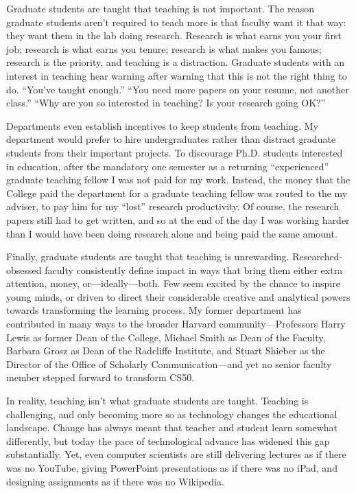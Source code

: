 Graduate students are taught that teaching is not important. The reason
graduate students aren't required to teach more is that faculty want it that
way: they want them in the lab doing research. Research is what earns you
your first job; research is what earns you tenure; research is what makes you
famous; research is the priority, and teaching is a distraction. Graduate
students with an interest in teaching hear warning after warning that this is
not the right thing to do. ``You've taught enough.'' ``You need more papers
on your resume, not another class.'' ``Why are you so interested in teaching?
Is your research going OK?''

Departments even establish incentives to keep students from teaching. My
department would prefer to hire undergraduates rather than distract graduate
students from their important projects. To discourage Ph.D. students
interested in education, after the mandatory one semester as a returning
``experienced'' graduate teaching fellow I was not paid for my work. Instead,
the money that the College paid the department for a graduate teaching fellow
was routed to the my adviser, to pay him for my ``lost'' research
productivity. Of course, the research papers still had to get written, and so
at the end of the day I was working harder than I would have been doing
research alone and being paid the same amount.

Finally, graduate students are taught that teaching is unrewarding.
Researched-obsessed faculty consistently define impact in ways that bring
them either extra attention, money, or---ideally---both. Few seem excited by
the chance to inspire young minds, or driven to direct their considerable
creative and analytical powers towards transforming the learning process.  My
former department has contributed in many ways to the broader Harvard
community---Professors Harry Lewis as former Dean of the College, Michael
Smith as Dean of the Faculty, Barbara Grosz as Dean of the Radcliffe
Institute, and Stuart Shieber as the Director of the Office of Scholarly
Communication---and yet no senior faculty member stepped forward to transform
CS50.

In reality, teaching isn't what graduate students are taught. Teaching is
challenging, and only becoming more so as technology changes the educational
landscape. Change has always meant that teacher and student learn somewhat
differently, but today the pace of technological advance has widened this gap
substantially. Yet, even computer scientists are still delivering lectures as
if there was no YouTube, giving PowerPoint presentations as if there was no
iPad, and designing assignments as if there was no Wikipedia.

